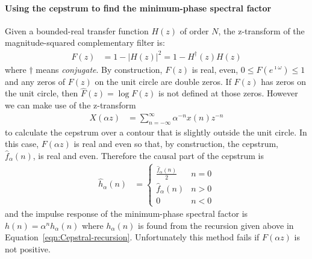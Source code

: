 \documentclass[a4paper,twoside,10pt,english]{report}
\begin{document}
\paragraph{Using the cepstrum to find the minimum-phase spectral factor}
Given a bounded-real transfer function $H\left(z\right)$ of order $N$, the
z-transform of the magnitude-squared complementary filter is:
\begin{align*}
  F\left(z\right)&=1-\left|H\left(z\right)\right|^{2}
  =1-H^{\dagger}\left(z\right)H\left(z\right)
\end{align*}
where $\dagger$ means \emph{conjugate}.
By construction, $F\left(z\right)$ is real, even,
$0\le F\left(e^{\imath\omega}\right) \le 1$ and any zeros of $F\left(z\right)$ 
on the unit circle are double zeros. If $F\left(z\right)$ has zeros on the unit
circle, then $\hat{F}\left(z\right)=\log F\left(z\right)$ is not defined at
those zeros. However we can make use of the z-transform
\begin{align*}
  X\left(\alpha z\right) &=
  \sum_{n=-\infty}^{\infty} \alpha^{-n}x\left(n\right)z^{-n}
\end{align*}
to calculate the cepstrum over a contour that is slightly outside the unit
circle. In this case, $F\left(\alpha z\right)$ is real and even so that,
by construction, the cepstrum, $\hat{f}_{\alpha}\left(n\right)$, is real and
even. Therefore the causal part of the cepstrum is
\begin{align*}
  \hat{h}_{\alpha}\left(n\right) &=\begin{cases}
  \frac{\hat{f}_{\alpha}\left(n\right)}{2} & n = 0\\
  \hat{f}_{\alpha}\left(n\right) & n > 0\\
  0 & n < 0
  \end{cases}
\end{align*}
and the impulse response of the minimum-phase spectral factor is
$h\left(n\right)=\alpha^{n}h_{\alpha}\left(n\right)$ where
$h_{\alpha}\left(n\right)$ is found from the recursion given above in
Equation~\ref{eqn:Cepstral-recursion}. Unfortunately this method fails if
$F\left(\alpha z\right)$ is not positive.
\end{document}

